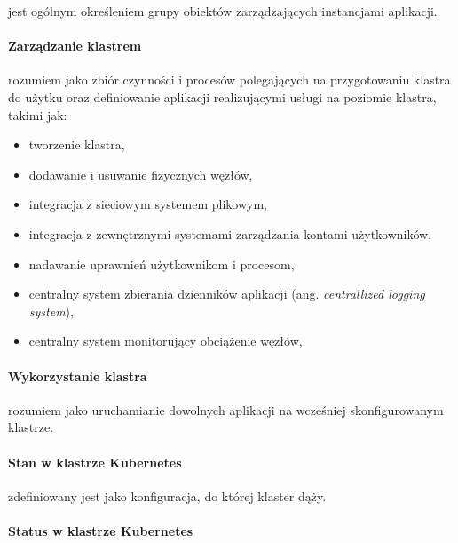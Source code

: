 \documentclass[a4paper,12pt,twoside,openany]{report}
\providecommand{\tightlist}{%
  \setlength{\itemsep}{0pt}\setlength{\parskip}{0pt}}
\begin{document}
jest ogólnym określeniem grupy obiektów zarządzających instancjami
aplikacji.

\hypertarget{zarzux105dzanie-klastrem}{%
\paragraph{Zarządzanie klastrem}\label{zarzux105dzanie-klastrem}}

rozumiem jako zbiór czynności i procesów polegających na przygotowaniu
klastra do użytku oraz definiowanie aplikacji realizującymi usługi na
poziomie klastra, takimi jak:

\begin{itemize}
\tightlist
\item
  tworzenie klastra,
\item
  dodawanie i usuwanie fizycznych węzłów,
\item
  integracja z sieciowym systemem plikowym,
\item
  integracja z zewnętrznymi systemami zarządzania kontami użytkowników,
\item
  nadawanie uprawnień użytkownikom i procesom,
\item
  centralny system zbierania dzienników aplikacji (ang.
  \emph{centrallized logging system}),
\item
  centralny system monitorujący obciążenie węzłów,
\end{itemize}

\hypertarget{wykorzystanie-klastra}{%
\paragraph{Wykorzystanie klastra}\label{wykorzystanie-klastra}}

rozumiem jako uruchamianie dowolnych aplikacji na wcześniej
skonfigurowanym klastrze.

\hypertarget{stan-w-klastrze-kubernetes}{%
\paragraph{Stan w klastrze
Kubernetes}\label{stan-w-klastrze-kubernetes}}

zdefiniowany jest jako konfiguracja, do której klaster dąży.

\hypertarget{status-w-klastrze-kubernetes}{%
\paragraph{Status w klastrze
Kubernetes}\label{status-w-klastrze-kubernetes}}
\end{document}
